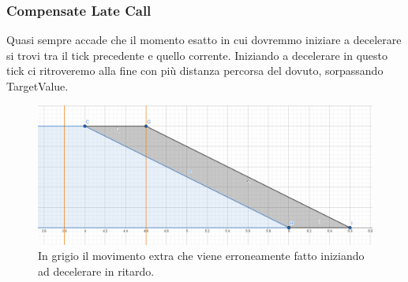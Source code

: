 \documentclass[main.tex]{subfiles}
\begin{document}
\subsubsection{Compensate Late Call}\label{subsubsec:4_2_CompensateLateCall}
Quasi sempre accade che il momento esatto in cui dovremmo iniziare a decelerare si trovi tra il tick precedente e quello corrente. Iniziando a decelerare in questo tick ci ritroveremo alla fine con più distanza percorsa del dovuto, sorpassando TargetValue.
\begin{figure}[H]
    \centering
    \includegraphics[width=.65\linewidth]{img/interpolazione/compensateLateCall.png}
    \caption{In grigio il movimento extra che viene erroneamente fatto iniziando ad decelerare in ritardo.}
    \label{fig:4_compensateLateCall}
\end{figure}
\end{document}
